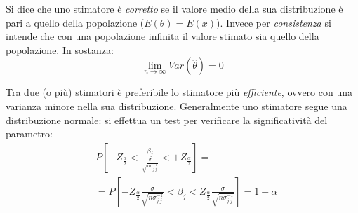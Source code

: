 \documentclass[11pt, twocolumn]{article}
\begin{document}
Si dice che uno stimatore è \textit{corretto} se il valore medio della sua distribuzione è pari a quello della popolazione ($E(\theta) = E(x)$).
Invece per \textit{consistenza} si intende che con una popolazione infinita il valore stimato sia quello della popolazione.
In sostanza:
$$\lim_{n\to\infty} Var(\hat{\theta}) = 0$$

Tra due (o più) stimatori è preferibile lo stimatore più \textit{efficiente}, ovvero con una varianza minore nella sua distribuzione.
Generalmente uno stimatore segue una distribuzione normale: si effettua un test per verificare la significatività del parametro:
\begin{align*}
  &P[-Z_{\frac{\alpha}{2}} < \frac{\beta_j}{\frac{\sigma}{\sqrt{n\sigma^{-1}_{j.j}}}} < +Z_{\frac{\alpha}{2}}] = \\
  &= P[-Z_{\frac{\alpha}{2}} \frac{\sigma}{\sqrt{n\sigma^{-1}_{j.j}}} < \beta_j < Z_{\frac{\alpha}{2}} \frac{\sigma}{\sqrt{n\sigma^{-1}_{j.j}}}] = 1 - \alpha
\end{align*}
\end{document}
